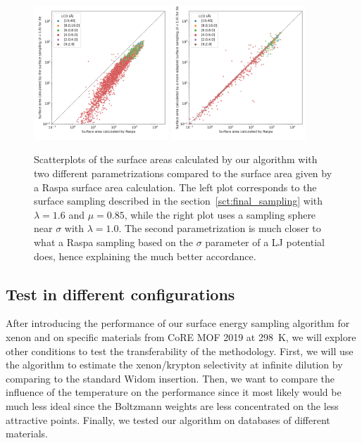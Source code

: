 \documentclass[main]{subfiles}
\begin{document}
\begin{figure}[ht]
  \centering
  \includegraphics[width=0.45\textwidth]{figures/3-fastsim/SA_raspa_Xe_m3_cm3_vs_SA_lambda_1.6_overview.jpg}
  \includegraphics[width=0.45\textwidth]{figures/3-fastsim/SA_raspa_Xe_m3_cm3_vs_SA_lambda_1.0_overview.jpg}
  \caption{Scatterplots of the surface areas calculated by our algorithm with two different parametrizations compared to the surface area given by a Raspa surface area calculation. The left plot corresponds to the surface sampling described in the section~\ref{sct:final_sampling} with $\lambda=1.6$ and $\mu=0.85$, while the right plot uses a sampling sphere near $\sigma$ with $\lambda=1.0$. The second parametrization is much closer to what a Raspa sampling based on the $\sigma$ parameter of a LJ potential does, hence explaining the much better accordance. }\label{fgr:surface_area}
\end{figure}

\subsection{Test in different configurations}

After introducing the performance of our surface energy sampling algorithm for xenon and on specific materials from CoRE MOF 2019 at \SI{298}{\kelvin}, we will explore other conditions to test the transferability of the methodology. First, we will use the algorithm to estimate the xenon/krypton selectivity at infinite dilution by comparing to the standard Widom insertion. Then, we want to compare the influence of the temperature on the performance since it most likely would be much less ideal since the Boltzmann weights are less concentrated on the less attractive points. Finally, we tested our algorithm on databases of different materials. 
\end{document}
